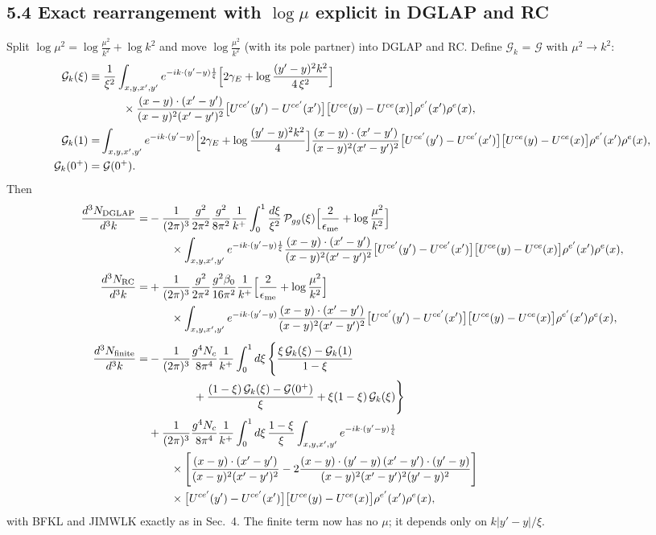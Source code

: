 \documentclass[10pt]{article}
\numberwithin{equation}{section}
\newcommand{\Wop}[2]{\big[U^{ce'}(#2)-U^{ce'}(x')\big]\big[U^{ce}(#1)-U^{ce}(x)\big]\rho^{e'}(x')\rho^{e}(x)}
\newcommand{\Kx}[2]{\frac{(x-#1)\cdot(x'-#2)}{(x-#1)^{2}(x'-#2)^{2}}}
\begin{document}
\subsection*{5.4 Exact rearrangement with $\log\mu$ explicit in DGLAP and RC}
Split $\log\mu^2=\log\frac{\mu^2}{k^2}+\log k^2$ and move $\log\frac{\mu^2}{k^2}$ (with its pole partner) into DGLAP and RC.
Define $\mathcal G_k$ = $\mathcal G$ with $\mu^2\to k^2$:
\begin{align}
\mathcal G_k(\xi)\equiv&\;\frac{1}{\xi^{2}}\int_{x,y,x',y'}e^{-ik\cdot(y'-y)\frac{1}{\xi}}\Big[2\gamma_{E}+\log\frac{(y'-y)^{2}k^{2}}{4\,\xi^{2}}\Big]\notag\\
&\qquad\times\Kx{y}{y'}\Wop{y}{y'},\\
\mathcal G_k(1)=&\int_{x,y,x',y'}e^{-ik\cdot(y'-y)}\Big[2\gamma_{E}+\log\frac{(y'-y)^{2}k^{2}}{4}\Big]\Kx{y}{y'}\Wop{y}{y'},\notag\\
\mathcal G_k(0^+)=&\;\mathcal G(0^+).\notag
\end{align}
Then
\begin{align}
\frac{d^{3}N_{\rm DGLAP}}{d^{3}k}=&-\frac{1}{(2\pi)^{3}}\frac{g^{2}}{2\pi^{2}}\frac{g^{2}}{8\pi^{2}}\frac{1}{k^{+}}\int_{0}^{1}\frac{d\xi}{\xi^{2}}\,\mathcal P_{gg}(\xi)\Big[\frac{2}{\epsilon_{\rm me}}+\log\frac{\mu^{2}}{k^{2}}\Big]\notag\\
&\qquad\times\int_{x,y,x',y'}e^{-ik\cdot(y'-y)\frac{1}{\xi}}\Kx{y}{y'}\Wop{y}{y'},\label{dglapmu}\\[4pt]
\frac{d^{3}N_{\rm RC}}{d^{3}k}=&+\frac{1}{(2\pi)^{3}}\frac{g^{2}}{2\pi^{2}}\frac{g^{2}\beta_{0}}{16\pi^{2}}\frac{1}{k^{+}}\Big[\frac{2}{\epsilon_{\rm me}}+\log\frac{\mu^{2}}{k^{2}}\Big]\notag\\
&\qquad\times\int_{x,y,x',y'}e^{-ik\cdot(y'-y)}\Kx{y}{y'}\Wop{y}{y'},\label{rcmu}\\[4pt]
\frac{d^{3}N_{\rm finite}}{d^{3}k}=&-\frac{1}{(2\pi)^{3}}\frac{g^{4}N_{c}}{8\pi^{4}}\frac{1}{k^{+}}\int_{0}^{1}d\xi\,\Bigg\{\frac{\xi\,\mathcal G_k(\xi)-\mathcal G_k(1)}{1-\xi}\notag\\
&\qquad\qquad+\frac{(1-\xi)\,\mathcal G_k(\xi)-\mathcal G(0^+)}{\xi}+\xi(1-\xi)\,\mathcal G_k(\xi)\Bigg\}\notag\\
&+\frac{1}{(2\pi)^{3}}\frac{g^{4}N_{c}}{8\pi^{4}}\frac{1}{k^{+}}\int_{0}^{1}d\xi\,\frac{1-\xi}{\xi}\int_{x,y,x',y'}e^{-ik\cdot(y'-y)\frac{1}{\xi}}\notag\\
&\qquad\times\Bigg[\Kx{y}{y'}-2\frac{(x-y)\cdot(y'-y)\,(x'-y')\cdot(y'-y)}{(x-y)^{2}(x'-y')^{2}(y'-y)^{2}}\Bigg]\notag\\
&\qquad\times\Wop{y}{y'},
\end{align}
with BFKL and JIMWLK exactly as in Sec.~4. The finite term now has no $\mu$; it depends only on $k|y'-y|/\xi$.
\end{document}
